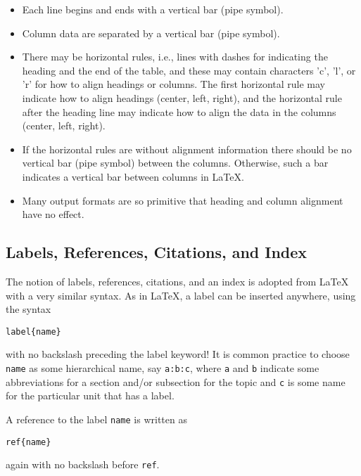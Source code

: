 \documentclass[%
oneside,                 %
final,                   %
10pt]{article}
\begin{document}
\begin{itemize}
 \item Each line begins and ends with a vertical bar (pipe symbol).

 \item Column data are separated by a vertical bar (pipe symbol).

 \item There may be horizontal rules, i.e., lines with dashes for
   indicating the heading and the end of the table, and these may
   contain characters 'c', 'l', or 'r' for how to align headings or
   columns. The first horizontal rule may indicate how to align
   headings (center, left, right), and the horizontal rule after the
   heading line may indicate how to align the data in the columns
   (center, left, right).

 \item If the horizontal rules are without alignment information there should
   be no vertical bar (pipe symbol) between the columns. Otherwise, such
   a bar indicates a vertical bar between columns in {\LaTeX}.

 \item Many output formats are so primitive that heading and column alignment
   have no effect.
\end{itemize}

\noindent

\subsection{Labels, References, Citations, and Index}

The notion of labels, references, citations, and an index is adopted
from {\LaTeX} with a very similar syntax. As in {\LaTeX}, a label can be
inserted anywhere, using the syntax
\begin{Verbatim}[numbers=none,fontsize=\fontsize{9pt}{9pt},baselinestretch=0.85,xleftmargin=0mm]
label{name}
\end{Verbatim}
with no backslash
preceding the label keyword! It is common practice to choose \Verb!name!
as some hierarchical name, say \Verb!a:b:c!, where \Verb!a! and \Verb!b! indicate
some abbreviations for a section and/or subsection for the topic and
\Verb!c! is some name for the particular unit that has a label.

A reference to the label \Verb!name! is written as
\begin{Verbatim}[numbers=none,fontsize=\fontsize{9pt}{9pt},baselinestretch=0.85,xleftmargin=0mm]
ref{name}
\end{Verbatim}
again with no backslash before \Verb!ref!.
\end{document}
